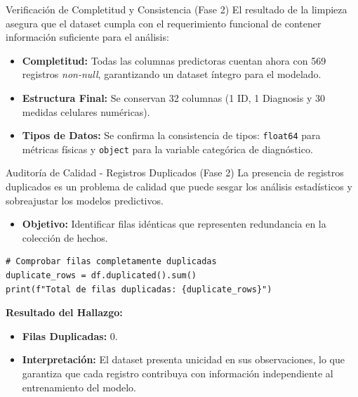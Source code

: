 \documentclass{beamer}
\begin{document}
	\begin{frame}{Verificación de Completitud y Consistencia (Fase 2)}
		El resultado de la limpieza asegura que el dataset cumpla con el requerimiento funcional de contener información suficiente para el análisis:
		
		\begin{itemize}
			\item<2-> \textbf{Completitud:} Todas las columnas predictoras cuentan ahora con 569 registros \textit{non-null}, garantizando un dataset íntegro para el modelado.
			\item<3-> \textbf{Estructura Final:} Se conservan 32 columnas (1 ID, 1 Diagnosis y 30 medidas celulares numéricas).
			\item<4-> \textbf{Tipos de Datos:} Se confirma la consistencia de tipos: \texttt{float64} para métricas físicas y \texttt{object} para la variable categórica de diagnóstico.
		\end{itemize}
	\end{frame}
	
	\begin{frame}[fragile]{Auditoría de Calidad - Registros Duplicados (Fase 2)}
		La presencia de registros duplicados es un problema de calidad que puede sesgar los análisis estadísticos y sobreajustar los modelos predictivos.
		
		\begin{itemize}
			\item<2-> \textbf{Objetivo:} Identificar filas idénticas que representen redundancia en la colección de hechos.
		\end{itemize}
		
		\begin{lstlisting}[style=colab]
# Comprobar filas completamente duplicadas
duplicate_rows = df.duplicated().sum()
print(f"Total de filas duplicadas: {duplicate_rows}")
		\end{lstlisting}
		
		\textbf{Resultado del Hallazgo:}
		\begin{itemize}
			\item \textbf{Filas Duplicadas:} 0.
			\item \textbf{Interpretación:} El dataset presenta unicidad en sus observaciones, lo que garantiza que cada registro contribuya con información independiente al entrenamiento del modelo.
		\end{itemize}
	\end{frame}
	
\end{document}
